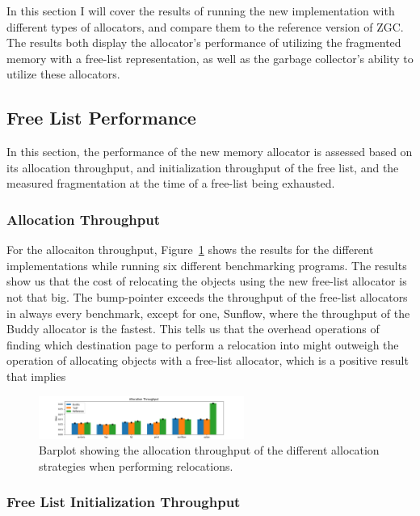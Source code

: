 
In this section I will cover the results of running the new implementation with different types of allocators, and compare them to the reference version of ZGC. The results both display the allocator's performance of utilizing the fragmented memory with a free-list representation, as well as the garbage collector's ability to utilize these allocators.

\subsection{Free List Performance}
In this section, the performance of the new memory allocator is assessed based on its allocation throughput, and initialization throughput of the free list, and the measured fragmentation at the time of a free-list being exhausted.

\subsubsection{Allocation Throughput}
For the allocaiton throughput, Figure~\ref*{fig:allocation-throughput} shows the results for the different implementations while running six different benchmarking programs. The results show us that the cost of relocating the objects using the new free-list allocator is not that big. The bump-pointer exceeds the throughput of the free-list allocators in always every benchmark, except for one, Sunflow, where the throughput of the Buddy allocator is the fastest. This tells us that the overhead operations of finding which destination page to perform a relocation into might outweigh the operation of allocating objects with a free-list allocator, which is a positive result that implies 

\begin{figure}[H]
\centering
\includegraphics[width=0.6\textwidth]{figures/allocation_throughput.png}
\caption{Barplot showing the allocation throughput of the different allocation strategies when performing relocations.}
\label{fig:allocation-throughput}
\end{figure}

\subsubsection{Free List Initialization Throughput}

